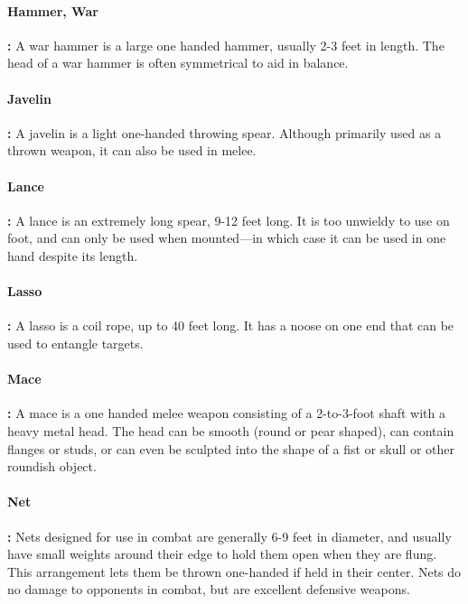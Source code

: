 \begin{multicols*}{2}
\paragraph{Hammer, War}\textbf{:} A war hammer is a large one handed hammer, usually 2-3 feet in length. The head of a war hammer is often symmetrical to aid in balance.

\paragraph{Javelin}\textbf{:} A javelin is a light one-handed throwing spear. Although primarily used as a thrown weapon, it can also be used in melee.

\paragraph{Lance}\textbf{:} A lance is an extremely long spear, 9-12 feet long. It is too unwieldy to use on foot, and can only be used when mounted—in which case it can be used in one hand despite its length.

\paragraph{Lasso}\textbf{:} A lasso is a coil rope, up to 40 feet long. It has a noose on one end that can be used to entangle targets.

\paragraph{Mace}\textbf{:} A mace is a one handed melee weapon consisting of a 2-to-3-foot shaft with a heavy metal head. The head can be smooth (round or pear shaped), can contain flanges or studs, or can even be sculpted into the shape of a fist or skull or other roundish object.

\paragraph{Net}\textbf{:} Nets designed for use in combat are generally 6-9 feet in diameter, and usually have small weights around their edge to hold them open when they are flung. This arrangement lets them be thrown one-handed if held in their center. Nets do no damage to opponents in combat, but are excellent defensive weapons.


\end{multicols*}
